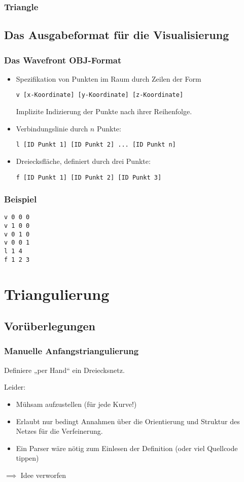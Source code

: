 \documentclass{beamer}
\begin{document}
\begin{frame}
	\frametitle{Triangle}
	
\end{frame}

\subsection{Das Ausgabeformat für die Visualisierung}

\begin{frame}[fragile]
	\frametitle{Das Wavefront OBJ-Format}
	\begin{itemize}
		\item
			Spezifikation von Punkten im Raum durch Zeilen der Form
			\begin{verbatim}
v [x-Koordinate] [y-Koordinate] [z-Koordinate]
			\end{verbatim}
			Implizite Indizierung der Punkte nach ihrer Reihenfolge.
		\item
			Verbindungslinie durch $n$ Punkte:
			\begin{verbatim}
l [ID Punkt 1] [ID Punkt 2] ... [ID Punkt n]
			\end{verbatim}
		\item
			Dreiecksfläche, definiert durch drei Punkte:
			\begin{verbatim}
f [ID Punkt 1] [ID Punkt 2] [ID Punkt 3]
			\end{verbatim}
	\end{itemize}
\end{frame}

\begin{frame}[fragile]
	\frametitle{Beispiel}
	\begin{verbatim}
v 0 0 0
v 1 0 0
v 0 1 0
v 0 0 1
l 1 4
f 1 2 3
	\end{verbatim}
\end{frame}


\section{Triangulierung}

\subsection{Vorüberlegungen}

\begin{frame}
	\frametitle{Manuelle Anfangstriangulierung}
	Definiere „per Hand“ ein Dreiecksnetz.

	Leider:
	\begin{itemize}
		\item
			Mühsam aufzustellen (für jede Kurve!)
		\item
			Erlaubt nur bedingt Annahmen über die Orientierung und Struktur des Netzes für die Verfeinerung.
		\item
			Ein Parser wäre nötig zum Einlesen der Definition (oder viel Quellcode tippen)
	\end{itemize}
	$\implies$ Idee verworfen
\end{frame}
\end{document}
